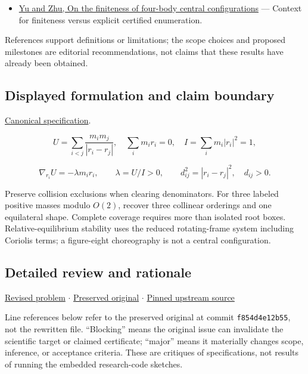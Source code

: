 \documentclass[
  11pt,
]{article}
\providecommand{\tightlist}{%
  \setlength{\itemsep}{0pt}\setlength{\parskip}{0pt}}
\begin{document}
\begin{itemize}
\tightlist
\item
  \href{https://arxiv.org/abs/2103.08906}{Yu and Zhu, On the finiteness
  of four-body central configurations} --- Context for finiteness versus
  explicit certified enumeration.
\end{itemize}

References support definitions or limitations; the scope choices and
proposed milestones are editorial recommendations, not claims that these
results have already been obtained.

\subsection{Displayed formulation and claim boundary}

\href{https://github.com/rick-stevens-ai/Pure-Thought/blob/main/PRDs/27-N-Body-Central-Configurations.md}{Canonical
specification}.

\[U=\sum_{i<j}\frac{m_im_j}{|r_i-r_j|},\quad
\sum_i m_i r_i=0,\quad I=\sum_i m_i|r_i|^2=1,\]

\[\nabla_{r_i}U=-\lambda m_i r_i,\qquad\lambda=U/I>0,
\qquad d_{ij}^2=|r_i-r_j|^2,\quad d_{ij}>0.\]

Preserve collision exclusions when clearing denominators. For three
labeled positive masses modulo \(O(2)\), recover three collinear
orderings and one equilateral shape. Complete coverage requires more
than isolated root boxes. Relative-equilibrium stability uses the
reduced rotating-frame system including Coriolis terms; a figure-eight
choreography is not a central configuration.

\subsection{Detailed review and rationale}

\href{https://github.com/rick-stevens-ai/Pure-Thought/blob/main/PRDs/27-N-Body-Central-Configurations.md}{Revised
problem} \ensuremath{\cdot}
\href{https://github.com/rick-stevens-ai/Pure-Thought/blob/main/archive/original-PRDs/27-N-Body-Central-Configurations.md}{Preserved
original} \ensuremath{\cdot}
\href{https://github.com/rick-stevens-ai/Pure-Thought/blob/f854d4e12b55c1f5b5c2a964b75f2d23496d981e/PRDs/27-N-Body-Central-Configurations.md}{Pinned
upstream source}

Line references below refer to the preserved original at commit
\texttt{f854d4e12b55}, not the rewritten file. ``Blocking'' means the
original issue can invalidate the scientific target or claimed
certificate; ``major'' means it materially changes scope, inference, or
acceptance criteria. These are critiques of specifications, not results
of running the embedded research-code sketches.
\end{document}
